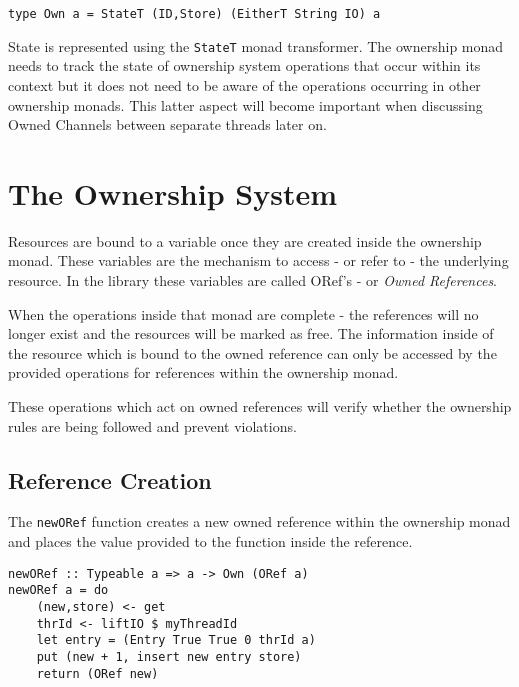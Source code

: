 \documentclass[onehalf,11pt]{beavtex}
\begin{document}
\begin{verbatim}
type Own a = StateT (ID,Store) (EitherT String IO) a
\end{verbatim}

State is represented using the \texttt{StateT} monad transformer.
The ownership monad needs to track the state of ownership system operations
that occur within its context but it does not need to be aware of the
operations occurring in other ownership monads. This latter aspect will become
important when discussing Owned Channels between separate threads later on.


\section{The Ownership System}

Resources are bound to a variable once they are created inside the ownership
monad.  These variables are the mechanism to access - or refer to - the
underlying resource.  In the library these variables are called ORef's -
or \textit{Owned References}.

When the operations inside that monad are complete - the references
will no longer exist and the resources will be marked as free.
The information inside of the resource which is bound to the owned reference can
only be accessed by the provided operations for references within the ownership
monad.

These operations which act on owned references will verify whether the ownership
rules are being followed and prevent violations.

\subsection{Reference Creation}

The \texttt{newORef} function creates a new owned reference
within the ownership monad and places the value provided to the function
inside the reference. 

\begin{verbatim}
newORef :: Typeable a => a -> Own (ORef a)
newORef a = do
    (new,store) <- get
    thrId <- liftIO $ myThreadId
    let entry = (Entry True True 0 thrId a)
    put (new + 1, insert new entry store)
    return (ORef new)
\end{verbatim}
\end{document}
